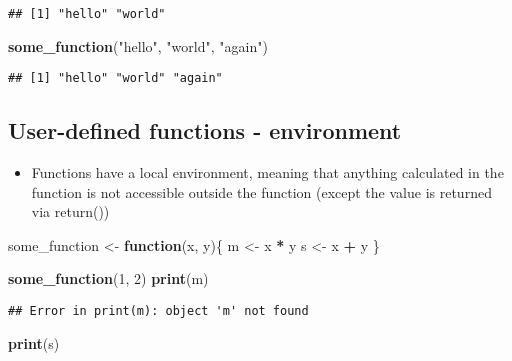 \documentclass[]{article}
\newenvironment{Shaded}{\begin{snugshade}}{\end{snugshade}}
\newcommand{\KeywordTok}[1]{\textcolor[rgb]{0.13,0.29,0.53}{\textbf{#1}}}
\newcommand{\DecValTok}[1]{\textcolor[rgb]{0.00,0.00,0.81}{#1}}
\newcommand{\StringTok}[1]{\textcolor[rgb]{0.31,0.60,0.02}{#1}}
\newcommand{\ControlFlowTok}[1]{\textcolor[rgb]{0.13,0.29,0.53}{\textbf{#1}}}
\newcommand{\OperatorTok}[1]{\textcolor[rgb]{0.81,0.36,0.00}{\textbf{#1}}}
\newcommand{\NormalTok}[1]{#1}
\providecommand{\tightlist}{%
  \setlength{\itemsep}{0pt}\setlength{\parskip}{0pt}}
\begin{document}
\begin{verbatim}
## [1] "hello" "world"
\end{verbatim}

\begin{Shaded}
\begin{Highlighting}[]
\KeywordTok{some_function}\NormalTok{(}\StringTok{"hello"}\NormalTok{, }\StringTok{"world"}\NormalTok{, }\StringTok{"again"}\NormalTok{)}
\end{Highlighting}
\end{Shaded}

\begin{verbatim}
## [1] "hello" "world" "again"
\end{verbatim}

\subsection{User-defined functions -
environment}\label{user-defined-functions---environment}

\begin{itemize}
\tightlist
\item
  Functions have a local environment, meaning that anything calculated
  in the function is not accessible outside the function (except the
  value is returned via return())
\end{itemize}

\begin{Shaded}
\begin{Highlighting}[]
\NormalTok{some_function <-}\StringTok{ }\ControlFlowTok{function}\NormalTok{(x, y)\{}
\NormalTok{  m <-}\StringTok{ }\NormalTok{x }\OperatorTok{*}\StringTok{ }\NormalTok{y}
\NormalTok{  s <-}\StringTok{ }\NormalTok{x }\OperatorTok{+}\StringTok{ }\NormalTok{y}
\NormalTok{\}}

\KeywordTok{some_function}\NormalTok{(}\DecValTok{1}\NormalTok{, }\DecValTok{2}\NormalTok{)}
\KeywordTok{print}\NormalTok{(m)}
\end{Highlighting}
\end{Shaded}

\begin{verbatim}
## Error in print(m): object 'm' not found
\end{verbatim}

\begin{Shaded}
\begin{Highlighting}[]
\KeywordTok{print}\NormalTok{(s)}
\end{Highlighting}
\end{Shaded}
\end{document}
